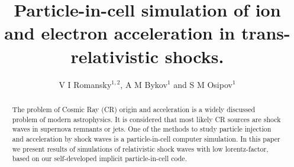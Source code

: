 \documentclass[a4paper]{jpconf}
\begin{document}
\title{Particle-in-cell simulation of ion and electron acceleration in trans-relativistic shocks.}

\author{V I Romansky$^{1,2}$, A M Bykov$^1$ and S M Osipov$^1$}

\address{$^1$ Ioffe Institute, 26 Politekhnicheskaya st., St. Petersburg 194021, Russia}
\address{$^2$ 
Sternberg Astronomical Institute, Moscow State University
 Universitetsky pr., 13, Moscow 119234, Russia}


\begin{abstract}
The problem of Cosmic Ray (CR) origin and acceleration is a widely discussed problem of
modern astrophysics. It is considered that most likely CR sources are 
shock waves in supernova remnants or jets. One of the methods to study particle injection and acceleration by shock
waves is a particle-in-cell computer simulation. In this paper we present results of
simulations of relativistic shock waves with low lorentz-factor, based on our self-developed implicit particle-in-cell code. 
\end{abstract}




\end{document}
